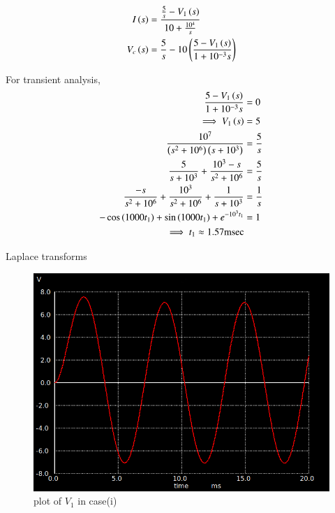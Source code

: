 \documentclass[journal,12pt,twocolumn]{IEEEtran}
\begin{document}
\begin{align}
    I\left(s\right) &= \frac{\frac{5}{s} - V_1\left(s\right)}{10 + \frac{10^4}{s}}\\
    V_c\left(s\right) &= \frac{5}{s} - 10\left(\frac{5-V_1\left(s\right)}{1+10^{-3}s}\right)
\end{align}

For transient analysis,
\begin{align}
    \frac{5-V_1\left(s\right)}{1+10^{-3}s} &= 0\\
    \implies V_1\left(s\right) &= 5\\
    \frac{10^7}{\left(s^2+10^6\right)\left(s+10^3\right)} &= \frac{5}{s}\\
    \frac{5}{s+10^3} + \frac{10^3-s}{s^2 + 10^6} &= \frac{5}{s}\\
    \frac{-s}{s^2+10^6} + \frac{10^3}{s^2 + 10^6} + \frac{1}{s+10^3} &= \frac{1}{s}\\
    -\cos\left(1000t_1\right)+\sin\left(1000t_1\right)+e^{-10^3 t_1} &= 1\\
    \implies t_1 \approx 1.57\text{msec}
\end{align}



\begin{table}[ht]
    
    \vspace{0.5cm}
    \caption{Laplace transforms}
    \label{tab:Gate.ee.54.1}
\end{table}

\begin{figure}[ht]
    \centering
    \includegraphics[width=1\columnwidth]{figs/fig1.png}
    \caption{plot of $V_1$ in case(i)}
    \label{fig:fig1.gate.ee.23.54}
\end{figure}
\end{document}
